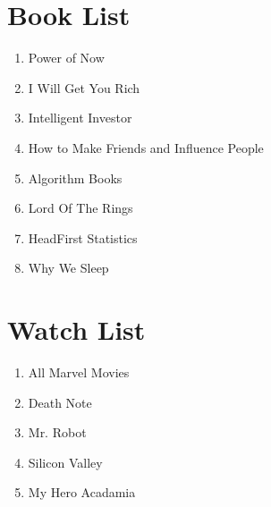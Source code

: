 \documentclass[10pt]{article}
\begin{document}
\section*{Book List}
\begin{enumerate}
    \item Power of Now
    \item I Will Get You Rich
    \item Intelligent Investor
    \item How to Make Friends and Influence People
    \item Algorithm Books
    \item Lord Of The Rings
    \item HeadFirst Statistics
    \item Why We Sleep
\end{enumerate}

\section*{Watch List}
\begin{enumerate}
    \item All Marvel Movies
    \item Death Note
    \item Mr. Robot
    \item Silicon Valley
    \item My Hero Acadamia
\end{enumerate}
\end{document}
